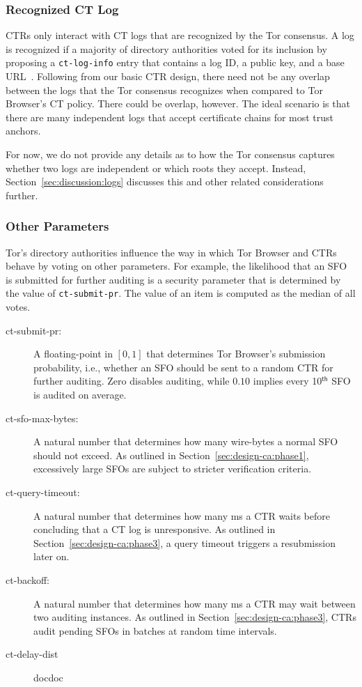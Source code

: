 \subsubsection{Recognized CT Log} \label{sec:design-ca:consensus:log}
CTRs only interact with CT logs that are recognized by the Tor consensus.  A log
is recognized if a majority of directory authorities voted for its inclusion by
proposing a \texttt{ct-log-info} entry that contains a log ID, a public key, and
a base URL~\cite{ct,ct/bis}. 
Following from our basic CTR design, there need not be any overlap between the
logs that the Tor consensus recognizes when compared to Tor Browser's CT policy.
There could be overlap, however.  The ideal scenario is that there are many
independent logs that accept certificate chains for most trust anchors.

For now, we do not provide any details as to how the Tor consensus captures
whether two logs are independent or which roots they accept.  Instead,
Section~\ref{sec:discussion:logs} discusses this and other related
considerations further.

\subsubsection{Other Parameters} \label{sec:design-ca:consensus:params}
Tor's directory authorities influence the way in which Tor Browser and CTRs
behave by voting on other parameters.  For example, the likelihood that
an SFO is submitted for further auditing is a security parameter that is
determined by the value of \texttt{ct-submit-pr}.  The value of an item is
computed as the median of all votes.
\begin{description}
	\item[ct-submit-pr:] A floating-point in $[0,1]$ that determines Tor
		Browser's submission probability, i.e., whether an SFO should be sent to
		a random CTR for further auditing.  Zero disables auditing,
		while $0.10$ implies every 10$^{\mathsf{th}}$ SFO is audited
		on average.
	\item[ct-sfo-max-bytes:] A natural number that determines how many
		wire-bytes a normal SFO should not exceed.  As outlined in
		Section~\ref{sec:design-ca:phase1}, excessively large SFOs are subject
		to stricter verification criteria.
	\item[ct-query-timeout:] A natural number that determines how many ms a CTR
		waits before concluding that a CT log is unresponsive.  As outlined in
		Section~\ref{sec:design-ca:phase3}, a query timeout triggers a
		resubmission later on.
	\item[ct-backoff:] A natural number that determines how many ms a CTR
		may wait between two auditing instances.  As outlined in
		Section~\ref{sec:design-ca:phase3}, CTRs audit pending SFOs
		in batches at random time intervals.
	\item[ct-delay-dist] docdoc
\end{description}


